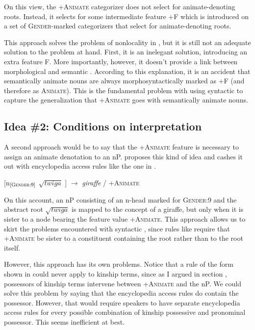\documentclass[output=paper
,newtxmath
,modfonts
,nonflat]{langsci/langscibook}
\begin{document}
On this view, the +\textsc{Animate} categorizer does not select for animate-denoting roots.  Instead, it selects for some intermediate feature +F which is introduced on a set of \textsc{Gender}-marked categorizers that select for animate-denoting roots.  

This approach solves the problem of nonlocality in , but it is still not an adequate solution to the problem at hand.  First, it is an inelegant solution, introducing an extra feature F.  More importantly, however, it doesn't provide a link between morphological  and semantic . According to this explanation, it is an accident that semantically animate nouns are always morphosyntactically marked as +F (and therefore as \textsc{Animate}).  This is the fundamental problem with using syntactic  to capture the generalization that +\textsc{Animate} goes with semantically animate nouns.  

\subsection{Idea \#2: Conditions on interpretation} \label{sec:pesetsky:conditiononinterp}

A second approach would be to say that the +\textsc{Animate} feature is necessary to assign an animate denotation to an nP.  \citet{kramer15} proposes this kind of idea and cashes it out with encyclopedia access rules like the one in .

\ea\label{ex:pesetsky:twiga} [n$_{[\textsc{Gender}:9]}$ $\sqrt{twiga}$ ] $\rightarrow$ \textit{giraffe} / +\textsc{Animate} \z

On this account, an nP consisting of an n-head marked for \textsc{Gender}:9 and the abstract root $\sqrt{twiga}$ is mapped to the concept of a giraffe, but only when it is sister to a node bearing the feature value +\textsc{Animate}.  This approach allows us to skirt the  problems encountered with syntactic , since rules like  require that +\textsc{Animate} be sister to a constituent containing the root rather than to the root itself.

However, this approach has its own  problems.  Notice that a rule of the form shown in  could never apply to kinship terms, since as I argued in section , possessors of kinship terms intervene between +\textsc{Animate} and the nP. We could solve this  problem by saying that the encyclopedia access rules do contain the possessor.  However, that would require  speakers to have separate encyclopedia access rules for every possible combination of kinship possessive and pronominal possessor.  This seems inefficient at best.
\end{document}
